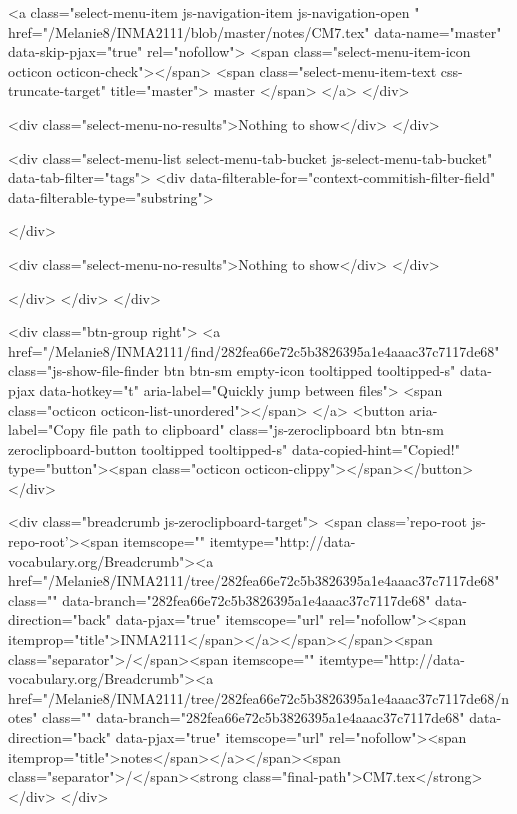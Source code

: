             <a class="select-menu-item js-navigation-item js-navigation-open "
               href="/Melanie8/INMA2111/blob/master/notes/CM7.tex"
               data-name="master"
               data-skip-pjax="true"
               rel="nofollow">
              <span class="select-menu-item-icon octicon octicon-check"></span>
              <span class="select-menu-item-text css-truncate-target" title="master">
                master
              </span>
            </a>
        </div>

          <div class="select-menu-no-results">Nothing to show</div>
      </div>

      <div class="select-menu-list select-menu-tab-bucket js-select-menu-tab-bucket" data-tab-filter="tags">
        <div data-filterable-for="context-commitish-filter-field" data-filterable-type="substring">


        </div>

        <div class="select-menu-no-results">Nothing to show</div>
      </div>

    </div>
  </div>
</div>

  <div class="btn-group right">
    <a href="/Melanie8/INMA2111/find/282fea66e72c5b3826395a1e4aaac37c7117de68"
          class="js-show-file-finder btn btn-sm empty-icon tooltipped tooltipped-s"
          data-pjax
          data-hotkey="t"
          aria-label="Quickly jump between files">
      <span class="octicon octicon-list-unordered"></span>
    </a>
    <button aria-label="Copy file path to clipboard" class="js-zeroclipboard btn btn-sm zeroclipboard-button tooltipped tooltipped-s" data-copied-hint="Copied!" type="button"><span class="octicon octicon-clippy"></span></button>
  </div>

  <div class="breadcrumb js-zeroclipboard-target">
    <span class='repo-root js-repo-root'><span itemscope="" itemtype="http://data-vocabulary.org/Breadcrumb"><a href="/Melanie8/INMA2111/tree/282fea66e72c5b3826395a1e4aaac37c7117de68" class="" data-branch="282fea66e72c5b3826395a1e4aaac37c7117de68" data-direction="back" data-pjax="true" itemscope="url" rel="nofollow"><span itemprop="title">INMA2111</span></a></span></span><span class="separator">/</span><span itemscope="" itemtype="http://data-vocabulary.org/Breadcrumb"><a href="/Melanie8/INMA2111/tree/282fea66e72c5b3826395a1e4aaac37c7117de68/notes" class="" data-branch="282fea66e72c5b3826395a1e4aaac37c7117de68" data-direction="back" data-pjax="true" itemscope="url" rel="nofollow"><span itemprop="title">notes</span></a></span><span class="separator">/</span><strong class="final-path">CM7.tex</strong>
  </div>
</div>


